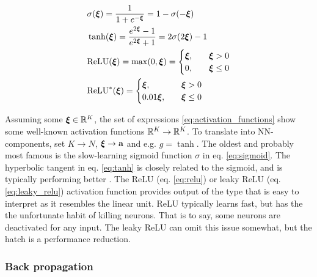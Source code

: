     \begin{subequations}\label{eq:activation_functions}
        \begin{align}
            &\sigma(\svec{\xi}) = \frac{1}{1+e^{-\svec{\xi}}} = 1- \sigma(-\svec{\xi})\label{eq:sigmoid}\\
            &\tanh(\svec{\xi}) = \frac{e^{2\svec{\xi}}-1}{e^{2\svec{\xi}}+1} = 2\sigma(2\svec{\xi}) -1\label{eq:tanh} \\
            &\mathrm{ReLU}(\svec{\xi}) = \max(0,\svec{\xi}) = \begin{cases}
                \svec{\xi},\quad &\svec{\xi} >0 \\
                0,\quad &\svec{\xi} \leq 0
            \end{cases} \label{eq:relu}\\
            &\mathrm{ReLU}^*(\svec{\xi})  = \begin{cases}
                \svec{\xi},\quad &\svec{\xi} >0 \\
                0.01\svec{\xi},\quad &\svec{\xi} \leq 0
            \end{cases} \label{eq:leaky_relu}
        \end{align}
    \end{subequations}

    Assuming some $\svec{\xi} \in \RR[K]$, the set of expressions \eqref{eq:activation_functions} show some well-known activation functions $\RR[K] \to \RR[K]$. To translate into NN-components, set $K\to N$, $\svec{\xi} \to \vec{a}$ and e.g. $g = \tanh$. 
    The oldest and probably most famous is the slow-learning sigmoid function $\sigma$ in eq. \eqref{eq:sigmoid}. The hyperbolic tangent in eq. \eqref{eq:tanh} is closely related to the sigmoid, and is typically performing better \citep{Goodfellow2016}. The ReLU (eq. \eqref{eq:relu}) or leaky ReLU (eq. \eqref{eq:leaky_relu}) activation function provides output of the type that is easy to interpret as it resembles the linear unit. ReLU typically learns fast, but has the the unfortunate habit of killing neurons. That is to say, some neurons are deactivated for any input. The leaky ReLU can omit this issue somewhat, but the hatch is a performance reduction.

    





    \subsubsection{Back propagation}\label{sec:back_propagation}


